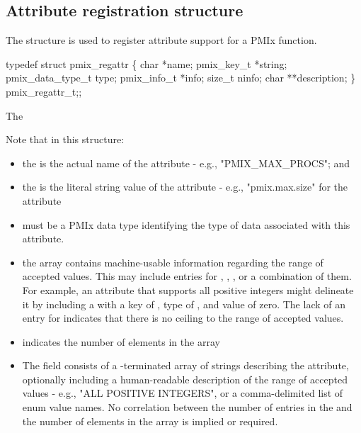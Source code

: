 \subsection{Attribute registration structure}

The  structure is used to register attribute support for a \ac{PMIx} function.

\cspecificstart
\begin{codepar}
typedef struct pmix_regattr \{
    char *name;
    pmix_key_t *string;
    pmix_data_type_t type;
    pmix_info_t *info;
    size_t ninfo;
    char **description;
\} pmix_regattr_t;;
\end{codepar}
\cspecificend

 The 

Note that in this structure:

\begin{itemize}
    \item the  is the actual name of the attribute - e.g., "PMIX_MAX_PROCS"; and
    \item the  is the literal string value of the attribute - e.g., "pmix.max.size" for the  attribute
    \item {} must be a \ac{PMIx} data type identifying the type of data associated with this attribute.
    \item the  array contains machine-usable information regarding the range of accepted values. This may include entries for , , , or a combination of them. For example, an attribute that supports all positive integers might delineate it by including a  with a key of , type of , and value of zero. The lack of an entry for  indicates that there is no ceiling to the range of accepted values.
    \item {} indicates the number of elements in the  array
    \item The  field consists of a -terminated array of strings describing the attribute, optionally including a human-readable description of the range of accepted values - e.g., "ALL POSITIVE INTEGERS", or a comma-delimited list of enum value names. No correlation between the number of entries in the  and the number of elements in the  array is implied or required.
\end{itemize}

